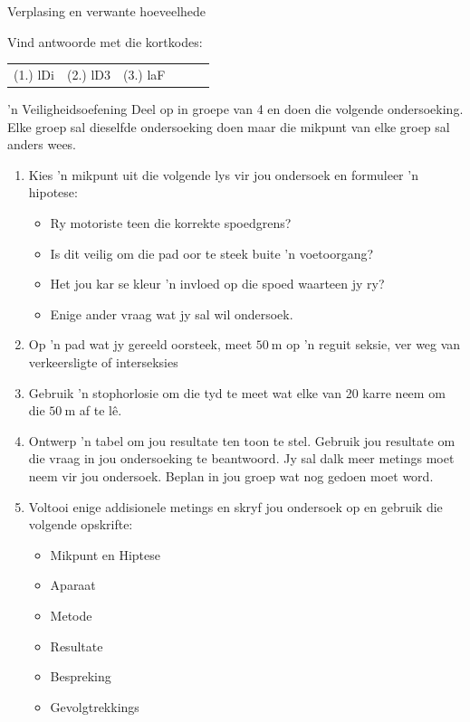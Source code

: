 \begin{exercises}{Verplasing en verwante hoeveelhede}
\par {} Vind antwoorde met die kortkodes:
 \par \begin{tabular}[h]{cccccc}
 (1.) lDi  &  (2.) lD3  &  (3.) laF  & \end{tabular}
\end{exercises} \pagebreak


\begin{Investigation}{'n Veiligheidsoefening}
            \nopagebreak
Deel op in groepe van 4 en doen die volgende ondersoeking. Elke groep sal dieselfde ondersoeking doen maar die mikpunt van elke groep sal anders wees.\par

\begin{enumerate}[noitemsep, label=\textbf{\arabic*}. ] 
    \item Kies 'n mikpunt uit die volgende lys vir jou ondersoek en formuleer 'n hipotese:
    \begin{itemize}[noitemsep]
        \item Ry motoriste teen die korrekte spoedgrens?
        \item Is dit veilig om die pad oor te steek buite 'n voetoorgang?
        \item Het jou kar se kleur 'n invloed op die spoed waarteen jy ry?
        \item Enige ander vraag wat jy sal wil ondersoek.
\end{itemize}

\item Op 'n pad wat jy gereeld oorsteek, meet $50~\text{m}$ op 'n reguit seksie, ver weg van verkeers\-ligte of interseksies
\item Gebruik 'n stophorlosie om die tyd te meet wat elke van 20 karre neem om die $50~\text{m}$ af te l\^e.
\item Ontwerp 'n tabel om jou resultate ten toon te stel. Gebruik jou resultate om die vraag in jou ondersoeking te beantwoord. Jy sal dalk meer metings moet neem vir jou ondersoek. Beplan in jou groep wat nog gedoen moet word.
\item Voltooi enige addisionele metings en skryf jou ondersoek op en gebruik die volgende opskrifte:
\begin{itemize}[noitemsep]
    \item Mikpunt en Hiptese
    \item Aparaat
    \item Metode
    \item Resultate
    \item Bespreking
    \item Gevolgtrekkings
\end{itemize}


\end{enumerate}
\end{Investigation}
